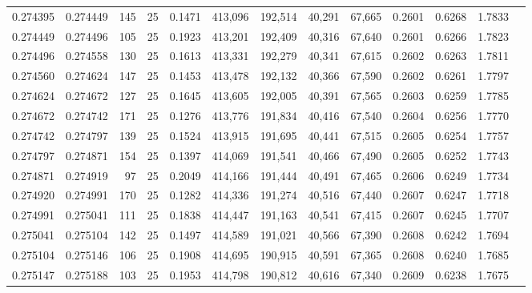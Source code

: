\begin{tabular}{rrrrrrrrrrrrr}
0.274395 & 0.274449 &   145 &  25 &                                     0.1471 & 413,096 & 192,514 &  40,291 &  67,665 & 0.2601 & 0.6268 & 1.7833 \\
0.274449 & 0.274496 &   105 &  25 &                                     0.1923 & 413,201 & 192,409 &  40,316 &  67,640 & 0.2601 & 0.6266 & 1.7823 \\
0.274496 & 0.274558 &   130 &  25 &                                     0.1613 & 413,331 & 192,279 &  40,341 &  67,615 & 0.2602 & 0.6263 & 1.7811 \\
0.274560 & 0.274624 &   147 &  25 &                                     0.1453 & 413,478 & 192,132 &  40,366 &  67,590 & 0.2602 & 0.6261 & 1.7797 \\
0.274624 & 0.274672 &   127 &  25 &                                     0.1645 & 413,605 & 192,005 &  40,391 &  67,565 & 0.2603 & 0.6259 & 1.7785 \\
0.274672 & 0.274742 &   171 &  25 &                                     0.1276 & 413,776 & 191,834 &  40,416 &  67,540 & 0.2604 & 0.6256 & 1.7770 \\
0.274742 & 0.274797 &   139 &  25 &                                     0.1524 & 413,915 & 191,695 &  40,441 &  67,515 & 0.2605 & 0.6254 & 1.7757 \\
0.274797 & 0.274871 &   154 &  25 &                                     0.1397 & 414,069 & 191,541 &  40,466 &  67,490 & 0.2605 & 0.6252 & 1.7743 \\
0.274871 & 0.274919 &    97 &  25 &                                     0.2049 & 414,166 & 191,444 &  40,491 &  67,465 & 0.2606 & 0.6249 & 1.7734 \\
0.274920 & 0.274991 &   170 &  25 &                                     0.1282 & 414,336 & 191,274 &  40,516 &  67,440 & 0.2607 & 0.6247 & 1.7718 \\
0.274991 & 0.275041 &   111 &  25 &                                     0.1838 & 414,447 & 191,163 &  40,541 &  67,415 & 0.2607 & 0.6245 & 1.7707 \\
0.275041 & 0.275104 &   142 &  25 &                                     0.1497 & 414,589 & 191,021 &  40,566 &  67,390 & 0.2608 & 0.6242 & 1.7694 \\
0.275104 & 0.275146 &   106 &  25 &                                     0.1908 & 414,695 & 190,915 &  40,591 &  67,365 & 0.2608 & 0.6240 & 1.7685 \\
0.275147 & 0.275188 &   103 &  25 &                                     0.1953 & 414,798 & 190,812 &  40,616 &  67,340 & 0.2609 & 0.6238 & 1.7675 \\

\end{tabular}
